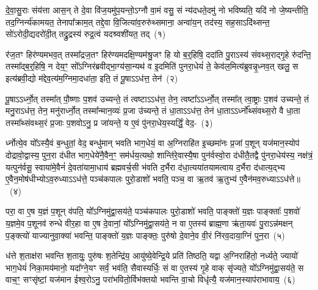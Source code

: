 \setcounter{anuvakam}{0}
दे॒वा॒सु॒राः संय॑त्ता आस॒न् ते दे॒वा वि॑ज॒यमु॑प॒यन्तो॒\-ऽग्नौ वा॒मं वसु॒ सं न्य॑दधते॒दमु॑ नो भविष्यति॒ यदि॑ नो जे॒ष्यन्तीति॒ तद॒ग्निर्न्य॑कामयत॒ तेनापा᳚क्राम॒त् तद्दे॒वा वि॒जित्या॑व॒रुरु॑थ्समाना॒ अन्वा॑य॒न् तद॑स्य॒ सह॒सा\-ऽदि॑थ्सन्त॒ सो॑\-ऽरोदी॒द्यदरो॑दी॒त् तद्रु॒द्रस्य॑ रुद्र॒त्वं यदश्र्वशी॑यत॒ तद्~(१)

र॑ज॒तꣳ हिर॑ण्यमभव॒त् तस्मा᳚द्रज॒तꣳ हिर॑ण्यमदक्षि॒ण्य\-म॑श्रु॒जꣳ हि यो ब॒र्॒\mbox{}हिषि॒ ददा॑ति पु॒रा\-ऽस्य॑ संवथ्स॒राद्गृ॒हे रु॑दन्ति॒ तस्मा᳚द्ब॒र्॒\mbox{}हिषि॒ न देय॒ꣳ॒ सो᳚\-ऽग्निर॑ब्रवीद्भा॒ग्य॑सा॒न्यथ॑ व इ॒दमिति॑ पुनरा॒धेयं॑ ते॒ केव॑ल॒मित्य॑ब्रुवन्नृ॒ध्नव॒त् खलु॒ स इत्य॑ब्रवी॒द्यो म॑द्देव॒त्य॑म॒ग्निमा॒दधा॑ता॒ इति॒ तं पू॒षा\-ऽऽ\-ध॑त्त॒ तेन॑~(२)

पू॒षा\-ऽऽ\-र्ध्नो॒त् तस्मा᳚त् पौ॒ष्णाः प॒शव॑ उच्यन्ते॒ तं त्वष्टा\-ऽऽ\-ध॑त्त॒ तेन॒ त्वष्टा᳚\-ऽऽ\-र्ध्नो॒त् तस्मा᳚त् त्वा॒ष्ट्राः प॒शव॑ उच्यन्ते॒ तं मनु॒रा\-ऽध॑त्त॒ तेन॒ मनु॑रार्ध्नो॒त् तस्मा᳚न्मान॒व्यः॑ प्र॒जा उ॑च्यन्ते॒ तं धा॒ता\-ऽऽ\-ध॑त्त॒ तेन॑ धा॒ता\-ऽऽ\-र्ध्नो᳚थ्संवथ्स॒रो वै धा॒ता तस्मा᳚थ्संवथ्स॒रं प्र॒जाः प॒शवो\-ऽनु॒ प्र जा॑यन्ते॒ य ए॒वं पु॑नरा॒धेय॒स्यर्द्धिं॒ वेद॒-~(३)

र्ध्नोत्ये॒व यो᳚\-ऽस्यै॒वं ब॒न्धुतां॒ वेद॒ बन्धु॑मान् भवति भाग॒धेयं॒ वा अ॒ग्निराहि॑त इ॒च्छमा॑नः प्र॒जां प॒शून् यज॑मान॒स्योप॑ दोद्रावो॒द्वास्य॒ पुन॒रा द॑धीत भाग॒धेये॑नै॒वैन॒ꣳ॒ सम॑र्धय॒त्यथो॒ शान्ति॑रे॒वास्यै॒षा पुन॑र्वस्वो॒रा द॑धीतै॒तद्वै पु॑नरा॒धेय॑स्य॒ नक्ष॑त्रं॒ यत्पुन॑र्वसू॒ स्वाया॑मे॒वैनं॑ दे॒वता॑यामा॒धाय॑ ब्रह्मवर्च॒सी भ॑वति द॒र्भैरा द॑धा॒त्यया॑तयामत्वाय द॒र्भैरा द॑धात्य॒द्भ्य ए॒वैन॒मोष॑धीभ्यो\-ऽव॒रुध्या\-ऽऽ\-ध॑त्ते॒ पञ्च॑कपालः पुरो॒डाशो॑ भवति॒ पञ्च॒ वा ऋ॒तव॑ ऋ॒तुभ्य॑ ए॒वैन॑मव॒रुध्या\-ऽऽ\-ध॑त्ते॥~(४)

{\anuvakamend[{अशी॑यत॒ तत् तेन॒ वेद॑ द॒र्भैः पञ्च॑विꣳशतिश्च}]}%

परा॒ वा ए॒ष य॒ज्ञं प॒शून् व॑पति॒ यो᳚\-ऽग्निमु॑द्वा॒सय॑ते॒ पञ्च॑कपालः पुरो॒डाशो॑ भवति॒ पाङ्क्तो॑ य॒ज्ञः पाङ्क्ताः᳚ प॒शवो॑ य॒ज्ञमे॒व प॒शूनव॑ रुन्धे वीर॒हा वा ए॒ष दे॒वानां॒ यो᳚\-ऽग्निमु॑द्वा॒सय॑ते॒ न वा ए॒तस्य॑ ब्राह्म॒णा ऋ॑ता॒यवः॑ पु॒रा\-ऽन्न॑मक्षन् प॒ङ्क्त्यो॑ याज्यानुवा॒क्या॑ भवन्ति॒ पाङ्क्तो॑ य॒ज्ञः पाङ्क्तः॒ पुरु॑षो दे॒वाने॒व वी॒रं नि॑रव॒दाया॒ग्निं पुन॒रा~(५)

ध॑त्ते श॒ताक्ष॑रा भवन्ति श॒तायुः॒ पुरु॑षः श॒तेन्द्रि॑य॒ आयु॑ष्ये॒वेन्द्रि॒ये प्रति॑ तिष्ठति॒ यद्वा अ॒ग्निराहि॑तो॒ नर्ध्यते॒ ज्यायो॑ भाग॒धेयं॑ निका॒मय॑मानो॒ यदा᳚ग्ने॒यꣳ सर्वं॒ भव॑ति॒ सैवास्यर्धिः॒ सं वा ए॒तस्य॑ गृ॒हे वाक् सृ॑ज्यते॒ यो᳚\-ऽग्निमु॑द्वा॒सय॑ते॒ स वाच॒ꣳ॒ सꣳसृ॑ष्टां॒ यज॑मान ईश्व॒रो\-ऽनु॒ परा॑भवितो॒र्विभ॑क्तयो भवन्ति वा॒चो विधृ॑त्यै॒ यज॑मान॒स्याप॑राभावाय॒~(६)

